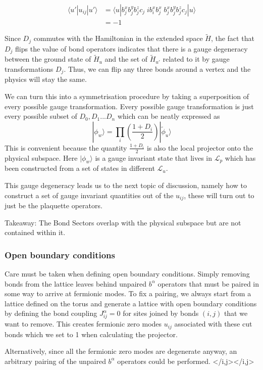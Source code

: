\[ \begin{aligned}
\langle u'|u_{ij}|u'\rangle &=  \langle u| b_j^x b_j^y b_j^z c_j \;ib^x_i b^x_j\; b_j^x b_j^y b_j^z c_j|u\rangle\\
&= -1
\end{aligned}\]

Since \(D_j\) commutes with the Hamiltonian in the extended space \(\tilde{H}\), the fact that \(D_j\) flips the value of bond operators indicates that there is a gauge degeneracy between the ground state of \(\tilde{H}_u\) and the set of \(\tilde{H}_{u'}\) related to it by gauge transformations \(D_j\). Thus, we can flip any three bonds around a vertex and the physics will stay the same.

We can turn this into a symmetrisation procedure by taking a superposition of every possible gauge transformation. Every possible gauge transformation is just every possible subset of \({D_0, D_1 ... D_n}\) which can be neatly expressed as \[|\phi_w\rangle = \prod_i \left( \frac{1 + D_i}{2}\right) |\tilde{\phi}_u\rangle\] This is convenient because the quantity \(\frac{1 + D_i}{2}\) is also the local projector onto the physical subspace. Here \(|\phi_w\rangle\) is a gauge invariant state that lives in \(\mathcal{L}_p\) which has been constructed from a set of states in different \(\mathcal{L}_u\).

This gauge degeneracy leads us to the next topic of discussion, namely how to construct a set of gauge invariant quantities out of the \(u_{ij}\), these will turn out to just be the plaquette operators.

Takeaway: The Bond Sectors overlap with the physical subspace but are not contained within it.

\hypertarget{open-boundary-conditions}{%
\subsubsection{Open boundary conditions}\label{open-boundary-conditions}}

Care must be taken when defining open boundary conditions. Simply removing bonds from the lattice leaves behind unpaired \(b^\alpha\) operators that must be paired in some way to arrive at fermionic modes. To fix a pairing, we always start from a lattice defined on the torus and generate a lattice with open boundary conditions by defining the bond coupling \(J^{\alpha}_{ij} = 0\) for sites joined by bonds \((i,j)\) that we want to remove. This creates fermionic zero modes \(u_{ij}\) associated with these cut bonds which we set to 1 when calculating the projector.

Alternatively, since all the fermionic zero modes are degenerate anyway, an arbitrary pairing of the unpaired \(b^\alpha\) operators could be performed. \textless/i,j\textgreater\textless/i,j\textgreater{}
